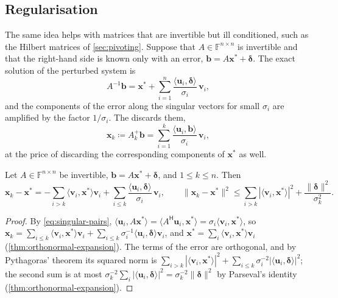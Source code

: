 \subsection{Regularisation}

The same idea helps with matrices that are invertible but ill conditioned, such as the Hilbert matrices of \cref{sec:pivoting}. Suppose that $A\in\mathbb F^{n\times n}$ is invertible and that the right-hand side is known only with an error, $\mathbf b=A\mathbf x^*+\boldsymbol\delta$. The exact solution of the perturbed system is
\[
A^{-1}\mathbf b=\mathbf x^*+\sum_{i=1}^n\frac{\langle\mathbf u_i,\boldsymbol\delta\rangle}{\sigma_i}\,\mathbf v_i ,
\]
and the components of the error along the singular vectors for small $\sigma_i$ are amplified by the factor $1/\sigma_i$. The  discards them,
\[
\mathbf x_k\coloneqq A_k^+\mathbf b=\sum_{i=1}^k\frac{\langle\mathbf u_i,\mathbf b\rangle}{\sigma_i}\,\mathbf v_i ,
\]
at the price of discarding the corresponding components of $\mathbf x^*$ as well.

\begin{proposition}
\label{prop:tsvd-error}
Let $A\in\mathbb F^{n\times n}$ be invertible, $\mathbf b=A\mathbf x^*+\boldsymbol\delta$, and $1\le k\le n$. Then
\[
\mathbf x_k-\mathbf x^*=-\sum_{i>k}\langle\mathbf v_i,\mathbf x^*\rangle\mathbf v_i+\sum_{i\le k}\frac{\langle\mathbf u_i,\boldsymbol\delta\rangle}{\sigma_i}\,\mathbf v_i,\qquad\|\mathbf x_k-\mathbf x^*\|^2\le\sum_{i>k}|\langle\mathbf v_i,\mathbf x^*\rangle|^2+\frac{\|\boldsymbol\delta\|^2}{\sigma_k^2}.
\]
\end{proposition}

\begin{proof}
By \eqref{eq:singular-pairs}, $\langle\mathbf u_i,A\mathbf x^*\rangle=\langle A^{\mathsf H}\mathbf u_i,\mathbf x^*\rangle=\sigma_i\langle\mathbf v_i,\mathbf x^*\rangle$, so $\mathbf x_k=\sum_{i\le k}\langle\mathbf v_i,\mathbf x^*\rangle\mathbf v_i+\sum_{i\le k}\sigma_i^{-1}\langle\mathbf u_i,\boldsymbol\delta\rangle\mathbf v_i$, and $\mathbf x^*=\sum_i\langle\mathbf v_i,\mathbf x^*\rangle\mathbf v_i$ (\cref{thm:orthonormal-expansion}). The terms of the error are orthogonal, and by Pythagoras' theorem its squared norm is $\sum_{i>k}|\langle\mathbf v_i,\mathbf x^*\rangle|^2+\sum_{i\le k}\sigma_i^{-2}|\langle\mathbf u_i,\boldsymbol\delta\rangle|^2$; the second sum is at most $\sigma_k^{-2}\sum_i|\langle\mathbf u_i,\boldsymbol\delta\rangle|^2=\sigma_k^{-2}\|\boldsymbol\delta\|^2$ by Parseval's identity (\cref{thm:orthonormal-expansion}).
\end{proof}

